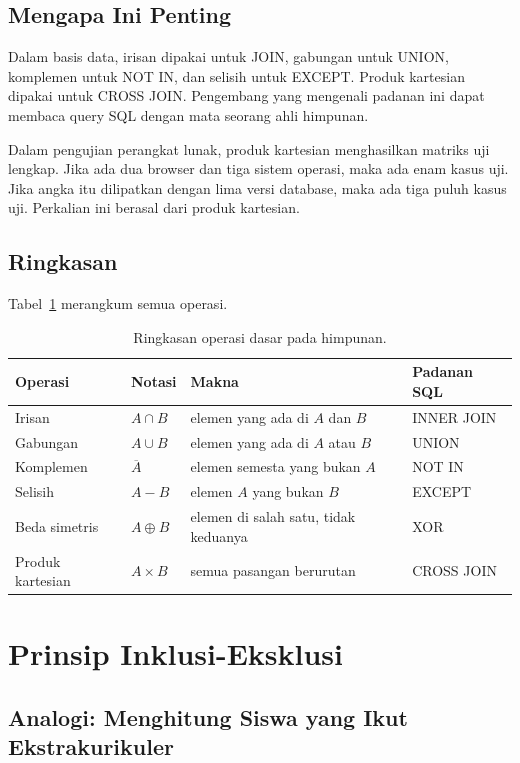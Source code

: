 \documentclass[11pt,a4paper]{article}
\begin{document}
\subsection{Mengapa Ini Penting}

Dalam basis data, irisan dipakai untuk JOIN, gabungan untuk UNION, komplemen untuk NOT IN, dan selisih untuk EXCEPT. Produk kartesian dipakai untuk CROSS JOIN. Pengembang yang mengenali padanan ini dapat membaca query SQL dengan mata seorang ahli himpunan.

Dalam pengujian perangkat lunak, produk kartesian menghasilkan matriks uji lengkap. Jika ada dua browser dan tiga sistem operasi, maka ada enam kasus uji. Jika angka itu dilipatkan dengan lima versi database, maka ada tiga puluh kasus uji. Perkalian ini berasal dari produk kartesian.

\subsection{Ringkasan}

Tabel~\ref{tab:operasi-himpunan} merangkum semua operasi.

\begin{table}[H]
	\centering
	\caption{Ringkasan operasi dasar pada himpunan.}
	\label{tab:operasi-himpunan}
	\small
	\begin{tabularx}{\textwidth}{l l X X}
		\toprule
		Operasi & Notasi & Makna & Padanan SQL \\
		\midrule
		Irisan & $A \cap B$ & elemen yang ada di $A$ dan $B$ & INNER JOIN \\
		Gabungan & $A \cup B$ & elemen yang ada di $A$ atau $B$ & UNION \\
		Komplemen & $\overline{A}$ & elemen semesta yang bukan $A$ & NOT IN \\
		Selisih & $A-B$ & elemen $A$ yang bukan $B$ & EXCEPT \\
		Beda simetris & $A \oplus B$ & elemen di salah satu, tidak keduanya & XOR \\
		Produk kartesian & $A \times B$ & semua pasangan berurutan & CROSS JOIN \\
		\bottomrule
	\end{tabularx}
\end{table}

\section{Prinsip Inklusi-Eksklusi}

\subsection{Analogi: Menghitung Siswa yang Ikut Ekstrakurikuler}
\end{document}
